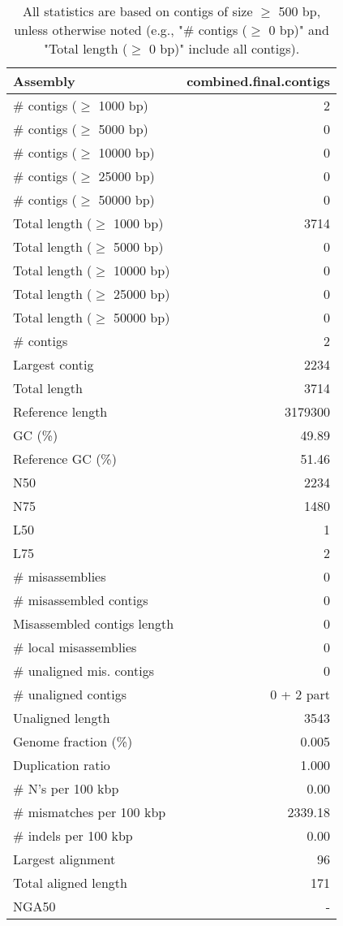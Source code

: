 \documentclass[12pt,a4paper]{article}
\begin{document}
\begin{table}[ht]
\begin{center}
\caption{All statistics are based on contigs of size $\geq$ 500 bp, unless otherwise noted (e.g., "\# contigs ($\geq$ 0 bp)" and "Total length ($\geq$ 0 bp)" include all contigs).}
\begin{tabular}{|l*{1}{|r}|}
\hline
Assembly & combined.final.contigs \\ \hline
\# contigs ($\geq$ 1000 bp) & 2 \\ \hline
\# contigs ($\geq$ 5000 bp) & 0 \\ \hline
\# contigs ($\geq$ 10000 bp) & 0 \\ \hline
\# contigs ($\geq$ 25000 bp) & 0 \\ \hline
\# contigs ($\geq$ 50000 bp) & 0 \\ \hline
Total length ($\geq$ 1000 bp) & 3714 \\ \hline
Total length ($\geq$ 5000 bp) & 0 \\ \hline
Total length ($\geq$ 10000 bp) & 0 \\ \hline
Total length ($\geq$ 25000 bp) & 0 \\ \hline
Total length ($\geq$ 50000 bp) & 0 \\ \hline
\# contigs & 2 \\ \hline
Largest contig & 2234 \\ \hline
Total length & 3714 \\ \hline
Reference length & 3179300 \\ \hline
GC (\%) & 49.89 \\ \hline
Reference GC (\%) & 51.46 \\ \hline
N50 & 2234 \\ \hline
N75 & 1480 \\ \hline
L50 & 1 \\ \hline
L75 & 2 \\ \hline
\# misassemblies & 0 \\ \hline
\# misassembled contigs & 0 \\ \hline
Misassembled contigs length & 0 \\ \hline
\# local misassemblies & 0 \\ \hline
\# unaligned mis. contigs & 0 \\ \hline
\# unaligned contigs & 0 + 2 part \\ \hline
Unaligned length & 3543 \\ \hline
Genome fraction (\%) & 0.005 \\ \hline
Duplication ratio & 1.000 \\ \hline
\# N's per 100 kbp & 0.00 \\ \hline
\# mismatches per 100 kbp & 2339.18 \\ \hline
\# indels per 100 kbp & 0.00 \\ \hline
Largest alignment & 96 \\ \hline
Total aligned length & 171 \\ \hline
NGA50 & - \\ \hline
\end{tabular}
\end{center}
\end{table}
\end{document}
